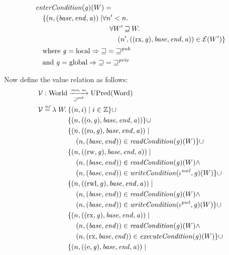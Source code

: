 \documentclass[a4paper]{article}
\newcommand{\defeq}{\stackrel{\textit{\tiny{def}}}{=}}
\newcommand{\union}{\mathbin{\cup}}
\newcommand{\var}[1]{\mathit{#1}}
\newcommand{\gl}{\var{g}}
\newcommand{\addr}{\var{a}}
\newcommand{\start}{\var{base}}
\newcommand{\addrend}{\var{end}}
\newcommand{\perm}{\var{perm}}
\newcommand{\stdcap}[1][(\perm,\gl)]{\left(#1,\start,\addrend,\addr \right)}
\newcommand{\nwl}{\var{nwl}}
\newcommand{\pwl}{\var{pwl}}
\newcommand{\plainfun}[2]{
  \ifthenelse{\equal{#2}{}}
  {\mathit{#1}}
  {\mathit{#1}(#2)}
}
\newcommand{\readCond}[1]{\plainfun{readCondition}{#1}}
\newcommand{\writeCond}[1]{\plainfun{writeCondition}{#1}}
\newcommand{\execCond}[1]{\plainfun{executeCondition}{#1}}
\newcommand{\entryCond}[1]{\plainfun{enterCondition}{#1}}
\newcommand{\future}{\mathbin{\sqsupseteq}}
\newcommand{\futurewk}{\mathbin{\sqsupseteq}^{\var{pub}}}
\newcommand{\futurestr}{\mathbin{\sqsupseteq}^{\var{priv}}}
\newcommand{\monwknefun}{\xrightarrow[\text{\tiny{$\futurewk$}}]{\textit{\tiny{mon, ne}}}}
\newcommand{\asmType}{\plaindom{AsmType}}
\newcommand{\plaindom}[1]{\mathrm{#1}}
\newcommand{\Words}{\plaindom{Word}}
\newcommand{\ints}{\mathbb{Z}}
\newcommand{\Worlds}{\plaindom{World}}
\newcommand{\UPred}[1]{\plaindom{UPred}(#1)}
\newcommand{\intr}[2]{\mathcal{#1}}
\newcommand{\valueintr}[1]{\intr{V}{#1}}
\newcommand{\exprintr}[1]{\intr{E}{#1}}
\newcommand{\stdvr}{\valueintr{\asmType}}
\newcommand{\stder}{\exprintr{\asmType}}
\newcommand{\npair}[2][n]{\left(#1,#2 \right)}
\newcommand{\plainperm}[1]{\mathrm{#1}}
\newcommand{\noperm}{\plainperm{o}}
\newcommand{\readonly}{\plainperm{ro}}
\newcommand{\readwrite}{\plainperm{rw}}
\newcommand{\exec}{\plainperm{rx}}
\newcommand{\entry}{\plainperm{e}}
\newcommand{\readwritel}{\plainperm{rwl}}
\newcommand{\local}{\plainperm{local}}
\newcommand{\glob}{\plainperm{global}}
\begin{document}
\begin{lemma}
\begin{align*}
  & \entryCond{}(\gl)(W) = \\
  & \quad
    \begin{aligned}[t]
      \{ \npair{(\start,\addrend,\addr)} \mid &  \forall n' < n \ldotp\\
      & \quad \forall W' \future W \ldotp\\
      & \qquad \npair[n']{((\exec,\gl),\start,\addrend,\addr)} \in \stder(W')\}
    \end{aligned} \\
  & \quad \text{where } \gl = \local \Rightarrow \future = \futurewk \\
  & \quad \text{and } \gl = \glob \Rightarrow \future = \futurestr
\end{align*}

Now define the value relation as follows:
\begin{align*}
  &\stdvr : \Worlds \monwknefun \UPred{\Words} \\
  &\stdvr\defeq \lambda \; W \ldotp 
    \begin{aligned}[t]
      & \{ \npair{i} \mid i \in \ints \} 
      \union \\
      & \{ \npair{\stdcap[(\noperm,\gl)] }  \} 
      \union \\
      & \{ \npair{\stdcap[(\readonly,\gl)] } \mid \\
      & \quad \npair{(\start,\addrend)} \in \readCond{}(\gl)(W)\} 
      \union \\
      & \{ \npair{\stdcap[(\readwrite,\gl)] } \mid \\
      & \quad \npair{(\start,\addrend)} \in \readCond{}(\gl)(W) \land \\
      & \quad \npair{(\start,\addrend)} \in \writeCond{}(\iota^\nwl,\gl)(W) \}
      \union \\
      & \{ \npair{\stdcap[(\readwritel,\gl)] } \mid \\
      & \quad \npair{(\start,\addrend)} \in \readCond{}(\gl)(W) \land \\
      & \quad \npair{(\start,\addrend)} \in \writeCond{}(\iota^\pwl,\gl)(W) \}
      \union \\
      & \{ \npair{\stdcap[(\exec,\gl)]} \mid \\
      & \quad \npair{(\start,\addrend)} \in \readCond{}(\gl)(W) \land \\
      & \quad \npair{(\exec,\start,\addrend)} \in \execCond{}(\gl)(W) \} 
      \union \\
      & \{ \npair{\stdcap[(\entry,\gl)]} \mid \\

\end{aligned}
\end{align*}
\end{lemma}
\end{document}
